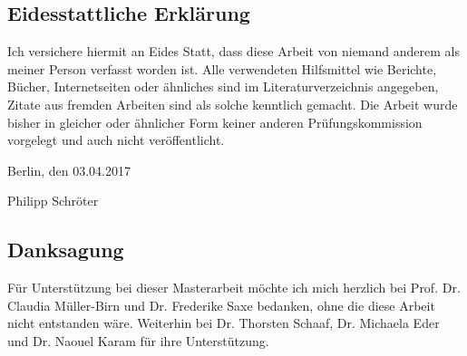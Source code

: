 %
\pagestyle{empty}

\subsection*{Eidesstattliche Erklärung}

Ich versichere hiermit an Eides Statt, dass diese Arbeit von niemand anderem als meiner Person verfasst worden ist. Alle verwendeten Hilfsmittel wie Berichte, Bücher, Internetseiten oder ähnliches sind im Literaturverzeichnis angegeben, Zitate aus fremden Arbeiten sind als solche kenntlich gemacht. Die Arbeit wurde bisher in gleicher oder ähnlicher Form keiner anderen Prüfungskommission vorgelegt und auch nicht veröffentlicht.
\par\bigskip  
\noindent Berlin, den 03.04.2017

\vspace{1.2cm}

\noindent Philipp Schröter

\pagebreak[4]

\subsection*{Danksagung}
Für Unterstützung bei dieser Masterarbeit möchte ich mich herzlich bei Prof. Dr.
Claudia Müller-Birn und Dr. Frederike Saxe bedanken, ohne die diese Arbeit nicht
entstanden wäre. Weiterhin bei Dr. Thorsten Schaaf, Dr. Michaela Eder und Dr.
Naouel Karam für ihre Unterstützung.

\cleardoublepage